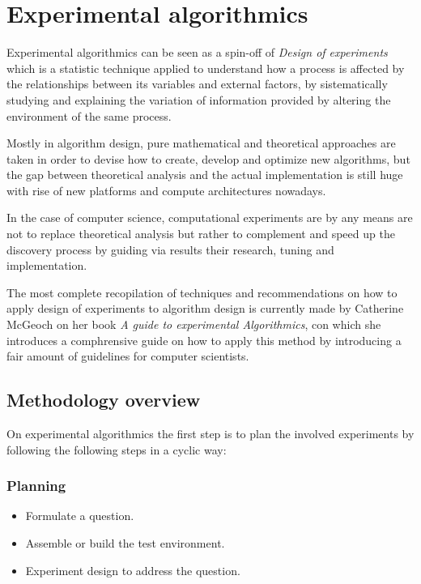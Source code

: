 \section{Experimental algorithmics}
Experimental algorithmics can be seen as a spin-off of \textit{Design of experiments} which is a statistic technique applied to understand how a process is affected by the relationships between its variables and external factors, by sistematically studying and explaining the variation of information provided by altering the environment of the same process\cite{Wagner_Mount_Giles_2014}.

Mostly in algorithm design, pure mathematical and theoretical approaches are taken in order to devise how to create, develop and optimize new algorithms, but the gap between theoretical analysis and the actual implementation is still huge with rise of new platforms and compute architectures nowadays.

In the case of computer science, computational experiments are by any means are not to replace theoretical analysis but rather to complement and speed up the discovery process by guiding via results their research, tuning and implementation.

The most complete recopilation of techniques and recommendations on how to apply design of experiments to algorithm design is currently made by Catherine McGeoch on her book \textit{A guide to experimental Algorithmics}\cite{10.5555/2159557}, con which she introduces a comphrensive guide on how to apply this method by introducing a fair amount of guidelines for computer scientists.

\subsection{Methodology overview}

On experimental algorithmics the first step is to plan the involved experiments by following the following steps in a cyclic way:

\subsubsection{Planning}
\begin{itemize}
    \item Formulate a question.
    \item Assemble or build the test environment.
    \item Experiment design to address the question.
\end{itemize}

